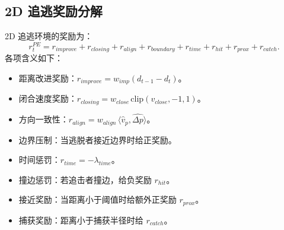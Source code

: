 \documentclass[11pt]{article}
\begin{document}
\subsection{2D 追逃奖励分解}
2D 追逃环境的奖励为：
\begin{equation}
 r_t^{PE} = r_{improve} + r_{closing} + r_{align} + r_{boundary} + r_{time} + r_{hit} + r_{prox} + r_{catch}.
\end{equation}
各项含义如下：
\begin{itemize}
  \item 距离改进奖励：$r_{improve} = w_{imp} (d_{t-1} - d_t)$。
  \item 闭合速度奖励：$r_{closing} = w_{close}\,\text{clip}(v_{close}, -1, 1)$。
  \item 方向一致性：$r_{align} = w_{align}\,\langle \hat{v}_p, \hat{\Delta p}\rangle$。
  \item 边界压制：当逃脱者接近边界时给正奖励。
  \item 时间惩罚：$r_{time}=-\lambda_{time}$。
  \item 撞边惩罚：若追击者撞边，给负奖励 $r_{hit}$。
  \item 接近奖励：当距离小于阈值时给额外正奖励 $r_{prox}$。
  \item 捕获奖励：距离小于捕获半径时给 $r_{catch}$。
\end{itemize}
\end{document}
